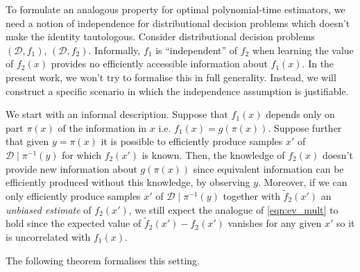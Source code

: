\documentclass[11pt]{article}
\numberwithin{equation}{section}
\theoremstyle{definition}
\theoremstyle{plain}
\newcommand{\Dist}{\mathcal{D}}
\begin{document}
To formulate an analogous property for optimal polynomial-time estimators, we need a notion of independence for distributional decision problems which doesn't make the identity tautologous. Consider distributional decision problems $(\Dist, f_1)$, $(\Dist, f_2)$. Informally, $f_1$ is \enquote{independent} of $f_2$ when learning the value of $f_2(x)$ provides no efficiently accessible information about $f_1(x)$. In the present work, we won't try to formalise this in full generality. Instead, we will construct a specific scenario in which the independence assumption is justifiable.

We start with an informal description. Suppose that $f_1(x)$ depends only on part $\pi(x)$ of the information in $x$ i.e. $f_1(x) = g(\pi(x))$. Suppose further that given $y=\pi(x)$ it is possible to efficiently produce samples $x'$ of $\Dist \mid \pi^{-1}(y)$ for which $f_2(x')$ is known. Then, the knowledge of $f_2(x)$ doesn't provide new information about $g(\pi(x))$ since equivalent information can be efficiently produced without this knowledge, by observing $y$.
 Moreover, if we can only efficiently produce samples $x'$ of $\Dist \mid \pi^{-1}(y)$ together with $\tilde{f}_2(x')$ an \emph{unbiased estimate} of $f_2(x')$, we still expect the analogue of \ref{eqn:ev_mult} to hold since the expected value of $\tilde{f}_2(x') - f_2(x')$ vanishes for any given $x'$ so it is uncorrelated with $f_1(x)$.
 
The following theorem formalises this setting.
\end{document}
